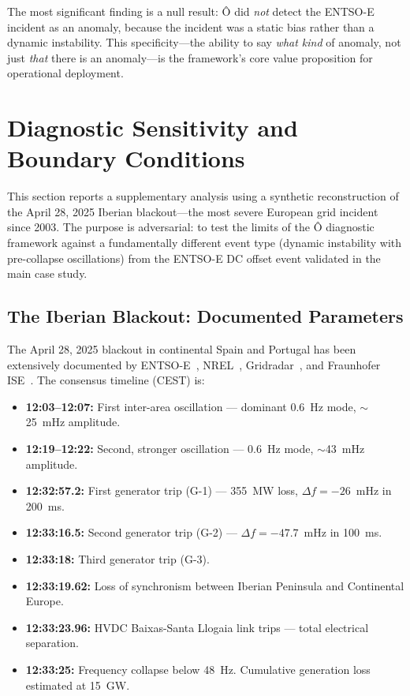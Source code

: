 \documentclass[11pt,a4paper]{article}
\begin{document}
The most significant finding is a null result: Ô did \emph{not} detect the ENTSO-E incident as an anomaly, because the incident was a static bias rather than a dynamic instability. This specificity—the ability to say \emph{what kind} of anomaly, not just \emph{that} there is an anomaly—is the framework's core value proposition for operational deployment.

\section{Diagnostic Sensitivity and Boundary Conditions}
\label{sec:boundary}

This section reports a supplementary analysis using a synthetic reconstruction of the April 28, 2025 Iberian blackout—the most severe European grid incident since 2003. The purpose is adversarial: to test the limits of the Ô diagnostic framework against a fundamentally different event type (dynamic instability with pre-collapse oscillations) from the ENTSO-E DC offset event validated in the main case study.

\subsection{The Iberian Blackout: Documented Parameters}

The April 28, 2025 blackout in continental Spain and Portugal has been extensively documented by ENTSO-E~\cite{entsoe_iberian_final}, NREL~\cite{nrel_iberian}, Gridradar~\cite{gridradar_iberian}, and Fraunhofer ISE~\cite{fraunhofer_iberian}. The consensus timeline (CEST) is:

\begin{itemize}
    \item \textbf{12:03--12:07:} First inter-area oscillation — dominant 0.6~Hz mode, $\sim$25~mHz amplitude.
    \item \textbf{12:19--12:22:} Second, stronger oscillation — 0.6~Hz mode, $\sim$43~mHz amplitude.
    \item \textbf{12:32:57.2:} First generator trip (G-1) — 355~MW loss, $\Delta f = -26$~mHz in 200~ms.
    \item \textbf{12:33:16.5:} Second generator trip (G-2) — $\Delta f = -47.7$~mHz in 100~ms.
    \item \textbf{12:33:18:} Third generator trip (G-3).
    \item \textbf{12:33:19.62:} Loss of synchronism between Iberian Peninsula and Continental Europe.
    \item \textbf{12:33:23.96:} HVDC Baixas-Santa Llogaia link trips — total electrical separation.
    \item \textbf{12:33:25:} Frequency collapse below 48~Hz. Cumulative generation loss estimated at 15~GW.
\end{itemize}
\end{document}
